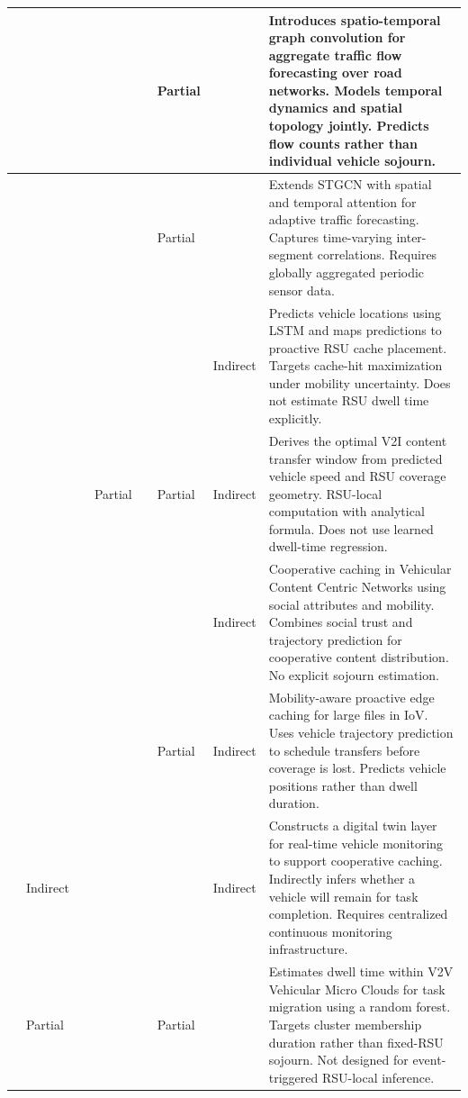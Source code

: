 \documentclass[journal]{IEEEtran}
\begin{document}
\begin{table}[!t]
\begin{tabular}{|C{1.5cm}|C{1.3cm}|C{1.3cm}|C{1.3cm}|C{1.4cm}|C{1.3cm}|C{1.3cm}|L{5.2cm}|}
\hline
\cite{Yu2018STGCN} &  &  &  &  & Partial &  &
{\small Introduces spatio-temporal graph convolution for aggregate traffic flow forecasting over road networks. Models temporal dynamics and spatial topology jointly. Predicts flow counts rather than individual vehicle sojourn.} \\
\hline
\cite{Guo2019ASTGCN} &  &  &  &  & Partial &  &
{\small Extends STGCN with spatial and temporal attention for adaptive traffic forecasting. Captures time-varying inter-segment correlations. Requires globally aggregated periodic sensor data.} \\
\hline
\cite{Khelifi2018} &  &  &  &  &  & Indirect &
{\small Predicts vehicle locations using LSTM and maps predictions to proactive RSU cache placement. Targets cache-hit maximization under mobility uncertainty. Does not estimate RSU dwell time explicitly.} \\
\hline
\cite{Nam2021Adaptive} &  &  & Partial &  & Partial & Indirect &
{\small Derives the optimal V2I content transfer window from predicted vehicle speed and RSU coverage geometry. RSU-local computation with analytical formula. Does not use learned dwell-time regression.} \\
\hline
\cite{Yao2021Coop} &  &  &  &  &  & Indirect &
{\small Cooperative caching in Vehicular Content Centric Networks using social attributes and mobility. Combines social trust and trajectory prediction for cooperative content distribution. No explicit sojourn estimation.} \\
\hline
\cite{Yu2023Mobility} &  &  &  &  & Partial & Indirect &
{\small Mobility-aware proactive edge caching for large files in IoV. Uses vehicle trajectory prediction to schedule transfers before coverage is lost. Predicts vehicle positions rather than dwell duration.} \\
\hline
\cite{DT2026} & Indirect &  &  &  &  & Indirect &
{\small Constructs a digital twin layer for real-time vehicle monitoring to support cooperative caching. Indirectly infers whether a vehicle will remain for task completion. Requires centralized continuous monitoring infrastructure.} \\
\hline
\cite{VMCdwell2023} & Partial &  &  &  & Partial &  &
{\small Estimates dwell time within V2V Vehicular Micro Clouds for task migration using a random forest. Targets cluster membership duration rather than fixed-RSU sojourn. Not designed for event-triggered RSU-local inference.} \\

\end{tabular}
\end{table}
\end{document}
